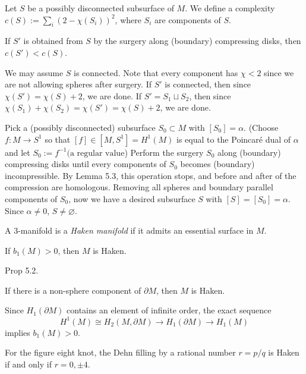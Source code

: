 \documentclass{../../small}
\begin{document}
Let $S$ be a possibly disconnected subsurface of $M$.
We define a complexity $c(S):=\sum_i(2-\chi(S_i))^2$, where $S_i$ are components of $S$.

\begin{lem}
If $S'$ is obtained from $S$ by the surgery along (boundary) compressing disks, then $c(S')<c(S)$.
\end{lem}
\begin{pf}
We may assume $S$ is connected.
Note that every component has $\chi<2$ since we are not allowing spheres after surgery.
If $S'$ is connected, then since $\chi(S')=\chi(S)+2$, we are done.
If $S'=S_1\sqcup S_2$, then since $\chi(S_1)+\chi(S_2)=\chi(S')=\chi(S)+2$, we are done.
\end{pf}

\begin{pf}
Pick a (possibly disconnected) subsurface $S_0\subset M$ with $[S_0]=\alpha$.
(Choose $f:M\to S^1$ so that $[f]\in[M,S^1]=H^1(M)$ is equal to the Poincar\'e dual of $\alpha$ and let $S_0:=f^{-1}(\text{a regular value}$)
Perform the surgery $S_0$ along (boundary) compressing disks until every components of $S_0$ becomes (boundary) incompressible.
By Lemma 5.3, this operation stops, and before and after of the compression are homologous.
Removing all spheres and boundary parallel components of $S_0$, now we have a desired subsurface $S$ with $[S]=[S_0]=\alpha$.
Since $\alpha\ne0$, $S\ne\varnothing$.
\end{pf}


A 3-manifold is a \emph{Haken manifold} if it admits an essential surface in $M$.

\begin{cor}
If $b_1(M)>0$, then $M$ is Haken.
\end{cor}
\begin{pf}
Prop 5.2.
\end{pf}
\begin{cor}
If there is a non-sphere component of $\partial M$, then $M$ is Haken.
\end{cor}
\begin{pf}
Since $H_1(\partial M)$ contains an element of infinite order, the exact sequence
\[H^1(M)\cong H_2(M,\partial M)\to H_1(\partial M)\to H_1(M)\]
implies $b_1(M)>0$.
\end{pf}


\begin{thm}[Thurston]
For the figure eight knot, the Dehn filling by a rational number $r=p/q$ is Haken if and only if $r=0,\pm4$.
\end{thm}
\end{document}
